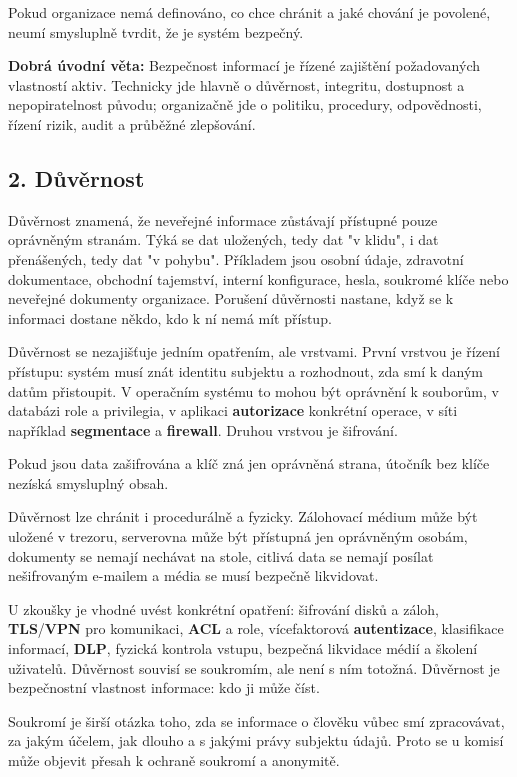 \documentclass[11pt,a4paper]{article}
\newcommand{\itbox}[1]{\medskip\noindent\colorbox{black!6}{\parbox{\dimexpr\linewidth-2\fboxsep}{#1}}\medskip}
\begin{document}
Pokud organizace nemá definováno, co chce chránit a jaké chování je povolené, neumí smysluplně tvrdit, že je systém bezpečný.

\itbox{\textbf{Dobrá úvodní věta:} Bezpečnost informací je řízené zajištění požadovaných vlastností aktiv. Technicky jde hlavně o důvěrnost, integritu, dostupnost a nepopiratelnost původu; organizačně jde o politiku, procedury, odpovědnosti, řízení rizik, audit a průběžné zlepšování.}

\subsection*{2. Důvěrnost}

Důvěrnost znamená, že neveřejné informace zůstávají přístupné pouze oprávněným stranám. Týká se dat uložených, tedy dat "v klidu", i dat přenášených, tedy dat "v pohybu". Příkladem jsou osobní údaje, zdravotní dokumentace, obchodní tajemství, interní konfigurace, hesla, soukromé klíče nebo neveřejné dokumenty organizace. Porušení důvěrnosti nastane, když se k informaci dostane někdo, kdo k ní nemá mít přístup.

Důvěrnost se nezajišťuje jedním opatřením, ale vrstvami. První vrstvou je řízení přístupu: systém musí znát identitu subjektu a rozhodnout, zda smí k daným datům přistoupit. V operačním systému to mohou být oprávnění k souborům, v databázi role a privilegia, v aplikaci \textbf{autorizace} konkrétní operace, v síti například \textbf{segmentace} a \textbf{firewall}. Druhou vrstvou je šifrování.

Pokud jsou data zašifrována a klíč zná jen oprávněná strana, útočník bez klíče nezíská smysluplný obsah.

Důvěrnost lze chránit i procedurálně a fyzicky. Zálohovací médium může být uložené v trezoru, serverovna může být přístupná jen oprávněným osobám, dokumenty se nemají nechávat na stole, citlivá data se nemají posílat nešifrovaným e-mailem a média se musí bezpečně likvidovat.

U zkoušky je vhodné uvést konkrétní opatření: šifrování disků a záloh, \textbf{TLS}/\textbf{VPN} pro komunikaci, \textbf{ACL} a role, vícefaktorová \textbf{autentizace}, klasifikace informací, \textbf{DLP}, fyzická kontrola vstupu, bezpečná likvidace médií a školení uživatelů. Důvěrnost souvisí se soukromím, ale není s ním totožná. Důvěrnost je bezpečnostní vlastnost informace: kdo ji může číst.

Soukromí je širší otázka toho, zda se informace o člověku vůbec smí zpracovávat, za jakým účelem, jak dlouho a s jakými právy subjektu údajů. Proto se u komisí může objevit přesah k ochraně soukromí a anonymitě.
\end{document}
